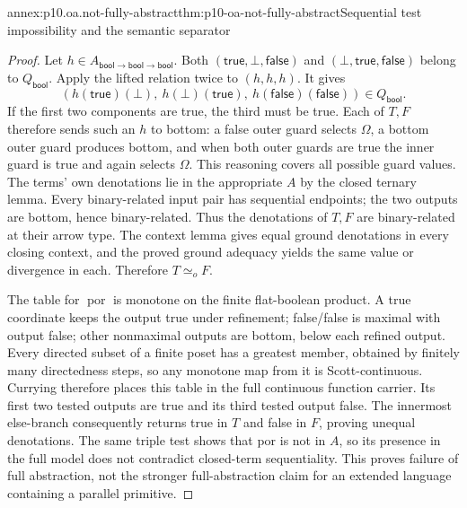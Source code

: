 \begin{annexitem}{annex:p10.oa.not-fully-abstract}{thm:p10-oa-not-fully-abstract}{Sequential test impossibility and the semantic separator}
\begin{proof}
Let \(h\in A_{\mathsf{bool}\to\mathsf{bool}\to\mathsf{bool}}\).
Both \((\mathsf{true},\bot,\mathsf{false})\) and
\((\bot,\mathsf{true},\mathsf{false})\) belong to \(Q_{\mathsf{bool}}\).
Apply the lifted relation twice to \((h,h,h)\). It gives
\[
 (h(\mathsf{true})(\bot),\ h(\bot)(\mathsf{true}),\
                  h(\mathsf{false})(\mathsf{false}))\in Q_{\mathsf{bool}}.
\]
If the first two components are true, the third must be true. Each
of \(T,F\) therefore sends such an \(h\) to bottom: a false outer
guard selects \(\Omega\), a bottom outer guard produces bottom, and
when both outer guards are true the inner guard is true and again
selects \(\Omega\). This reasoning covers all possible guard values.
The terms' own denotations lie in the appropriate \(A\) by the closed
ternary lemma. Every binary-related input pair has sequential endpoints;
the two outputs are bottom, hence binary-related. Thus the denotations
of \(T,F\) are binary-related at their arrow type. The context lemma
gives equal ground denotations in every closing context, and the proved
ground adequacy yields the same value or divergence in each. Therefore
\(T\simeq_o F\).

The table for \(\operatorname{por}\) is monotone on the finite
flat-boolean product. A true coordinate keeps the output true under
refinement; false/false is maximal with output false; other nonmaximal
outputs are bottom, below each refined output. Every directed subset
of a finite poset has a greatest member, obtained by finitely many
directedness steps, so any monotone map from it is Scott-continuous.
Currying therefore places this table in the full continuous function
carrier. Its first two tested outputs are true and its third tested
output false. The innermost else-branch consequently returns true in
\(T\) and false in \(F\), proving unequal denotations.
The same triple test shows that por is not in \(A\), so its presence
in the full model does not contradict closed-term sequentiality.
This proves failure of full abstraction, not the stronger full-abstraction
claim for an extended language containing a parallel primitive.
\end{proof}
\end{annexitem}
